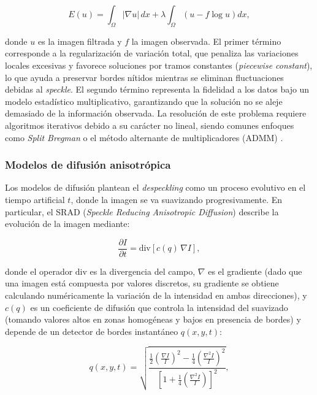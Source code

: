 \begin{equation}
	E(u) = \int_\Omega |\nabla u| \, dx + \lambda \int_\Omega \left(u - f \log u\right) dx,
\end{equation}

\vspace{0.3cm}

\noindent donde \(u\) es la imagen filtrada y \(f\) la imagen observada. El primer término corresponde a la regularización de variación total, que penaliza las variaciones locales excesivas y favorece soluciones por tramos constantes (\emph{piecewise constant}), lo que ayuda a preservar bordes nítidos mientras se eliminan fluctuaciones debidas al \emph{speckle}. El segundo término representa la fidelidad a los datos bajo un modelo estadístico multiplicativo, garantizando que la solución no se aleje demasiado de la información observada. La resolución de este problema requiere algoritmos iterativos debido a su carácter no lineal, siendo comunes enfoques como \emph{Split Bregman} \cite{goldstein2009split} o el método alternante de multiplicadores (ADMM) \cite{boyd2011distributed}.

\subsubsection{Modelos de difusión anisotrópica}

Los modelos de difusión plantean el \emph{despeckling} como un proceso evolutivo en el tiempo artificial \(t\), donde la imagen se va suavizando progresivamente. En particular, el SRAD (\emph{Speckle Reducing Anisotropic Diffusion}) \cite{yu2002speckle} describe la evolución de la imagen mediante:

\begin{equation}
	\frac{\partial I}{\partial t} = \text{div}\!\left[c(q) \, \nabla I\right],
\end{equation}

\vspace{0.3cm}

\noindent donde el operador $\text{div}$ es la divergencia del campo, $\nabla$ es el gradiente (dado que una imagen está compuesta por valores discretos, su gradiente se obtiene calculando numéricamente la variación de la intensidad en ambas direcciones), y \(c(q)\) es un coeficiente de difusión que controla la intensidad del suavizado (tomando valores altos en zonas homogéneas y bajos en presencia de bordes) y depende de un detector de bordes instantáneo \(q(x,y,t)\):

\begin{equation}
	q(x,y,t) = \sqrt{\frac{\tfrac{1}{2}\left(\frac{\nabla I}{I}\right)^2 - \tfrac{1}{4}\left(\frac{\nabla^2 I}{I}\right)^2}{\left[1 + \tfrac{1}{4}\left(\frac{\nabla^2 I}{I}\right)\right]^2}},
\end{equation}

